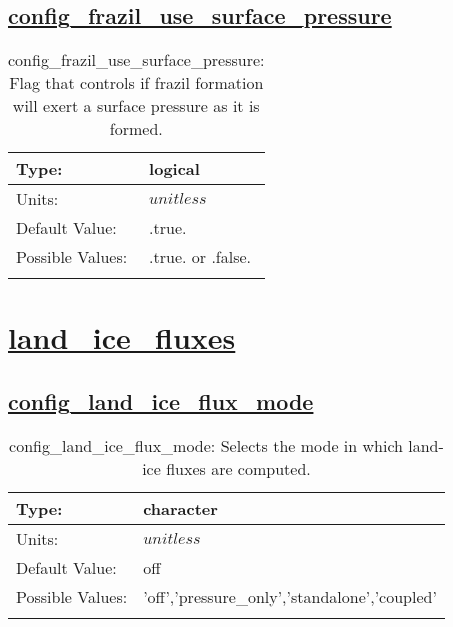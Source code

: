 \subsection[config\_frazil\_use\_surface\_pressure]{\hyperref[sec:nm_tab_frazil_ice]{config\_frazil\_use\_surface\_pressure}}
\label{subsec:nm_sec_config_frazil_use_surface_pressure}
\begin{center}
\begin{longtable}{| p{2.0in} || p{4.0in} |}
    \hline
    Type: & logical \\
    \hline
    Units: & $unitless$ \\
    \hline
    Default Value: & .true. \\
    \hline
    Possible Values: & .true. or .false. \\
    \hline
    \caption{config\_frazil\_use\_surface\_pressure: Flag that controls if frazil formation will exert a surface pressure as it is formed.}
\end{longtable}
\end{center}
\section[land\_ice\_fluxes]{\hyperref[sec:nm_tab_land_ice_fluxes]{land\_ice\_fluxes}}
\label{sec:nm_sec_land_ice_fluxes}
\subsection[config\_land\_ice\_flux\_mode]{\hyperref[sec:nm_tab_land_ice_fluxes]{config\_land\_ice\_flux\_mode}}
\label{subsec:nm_sec_config_land_ice_flux_mode}
\begin{center}
\begin{longtable}{| p{2.0in} || p{4.0in} |}
    \hline
    Type: & character \\
    \hline
    Units: & $unitless$ \\
    \hline
    Default Value: & off \\
    \hline
    Possible Values: & 'off','pressure\_only','standalone','coupled' \\
    \hline
    \caption{config\_land\_ice\_flux\_mode: Selects the mode in which land-ice fluxes are computed.}
\end{longtable}
\end{center}
